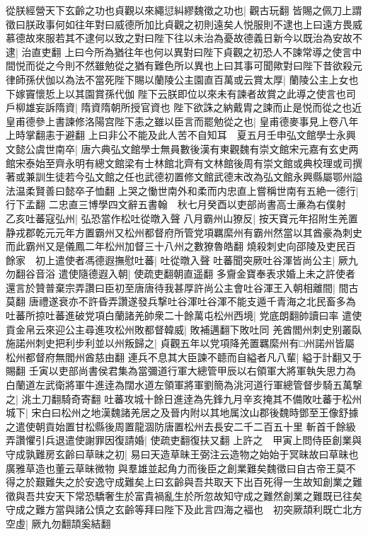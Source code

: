 從朕經營天下玄齡之功也貞觀以來繩愆糾繆魏徵之功也|{
	觀古玩翻}
皆賜之佩刀上謂徵曰朕政事何如往年對曰威德所加比貞觀之初則遠矣人悦服則不逮也上曰遠方畏威慕德故來服若其不逮何以致之對曰陛下往以未治為憂故德義日新今以既治為安故不逮|{
	治直吏翻}
上曰今所為猶往年也何以異對曰陛下貞觀之初恐人不諫常導之使言中間悦而從之今則不然雖勉從之猶有難色所以異也上曰其事可聞歟對曰陛下昔欲殺元律師孫伏伽以為法不當死陛下賜以蘭陵公主園直百萬或云賞太厚|{
	蘭陵公主上女也下嫁竇懷悊上以其園賞孫代伽}
陛下云朕即位以來未有諫者故賞之此導之使言也司戶柳雄妄訴隋資|{
	隋資隋朝所授官資也}
陛下欲誅之納戴胄之諫而止是悦而從之也近皇甫德參上書諫修洛陽宫陛下恚之雖以臣言而罷勉從之也|{
	皇甫德麥事見上卷八年上時掌翻恚于避翻}
上曰非公不能及此人苦不自知耳　夏五月壬申弘文館學士永興文懿公虞世南卒|{
	唐六典弘文館學士無員數後漢有東觀魏有崇文館宋元嘉有玄史两館宋泰始至齊永明有總文館梁有士林館北齊有文林館後周有崇文館或典校理或司撰著或兼訓生徒若今弘文館之任也武德初置修文館武德末改為弘文館永興縣屬鄂州謚法温柔賢善曰懿卒子恤翻}
上哭之慟世南外和柔而内忠直上嘗稱世南有五絶一德行|{
	行下孟翻}
二忠直三博學四文辭五書翰　秋七月癸酉以吏部尚書高士亷為右僕射　乙亥吐蕃寇弘州|{
	弘恐當作松吐從暾入聲}
八月霸州山獠反|{
	按天寶元年招附生羌置静戎郡乾元元年方置霸州又松州都督府所管党項羈縻州有霸州然當以其酋豪為刺史而此霸州又是儀鳳二年松州加督三十八州之數獠魯皓翻}
燒殺刺史向邵陵及吏民百餘家　初上遣使者馮德遐撫慰吐蕃|{
	吐從暾入聲}
吐蕃聞突厥吐谷渾皆尚公主|{
	厥九勿翻谷音浴}
遣使隨德遐入朝|{
	使疏吏翻朝直遥翻}
多齎金寶奉表求婚上未之許使者還言於贊普棄宗弄讚曰臣初至唐唐待我甚厚許尚公主會吐谷渾王入朝相離間|{
	間古莫翻}
唐禮遂衰亦不許昏弄讚遂發兵撃吐谷渾吐谷渾不能支遁千青海之北民畜多為吐蕃所掠吐蕃進破党項白蘭諸羌帥衆二十餘萬屯松州西境|{
	党底朗翻帥讀曰率}
遣使貢金帛云來迎公主尋進攻松州敗都督韓威|{
	敗補邁翻下敗吐同}
羌酋閻州刺史别叢臥施諾州刺史把利步利並以州叛歸之|{
	貞觀五年以党項降羌置羈縻州有□州諾州皆屬松州都督府無閻州酋慈由翻}
連兵不息其大臣諫不聼而自縊者凡八輩|{
	縊于計翻又于賜翻}
壬寅以吏部尚書侯君集為當彌道行軍大總管甲辰以右領軍大將軍執失思力為白蘭道左武衛將軍牛進逹為闊水道左領軍將軍劉簡為洮河道行軍總管督步騎五萬撃之|{
	洮土刀翻騎奇寄翻}
吐蕃攻城十餘日進逹為先鋒九月辛亥掩其不備敗吐蕃于松州城下|{
	宋白曰松州之地漢魏諸羌居之及晉内附以其地属汶山郡後魏時鄧至王像舒據之遣使朝貢始置甘松縣後周置龍涸防唐置松州去長安二千二百五十里}
斬首千餘級弄讚懼引兵退遣使謝罪因復請婚|{
	使疏吏翻復扶又翻}
上許之　甲寅上問侍臣創業與守成孰難房玄齡曰草昧之初|{
	易曰天造草昧王弼注云造物之始始于冥昧故曰草昧也廣雅草造也董云草昧微物}
與羣雄並起角力而後臣之創業難矣魏徵曰自古帝王莫不得之於艱難失之於安逸守成難矣上曰玄齡與吾共取天下出百死得一生故知創業之難徵與吾共安天下常恐驕奢生於富貴禍亂生於所忽故知守成之難然創業之難既已往矣守成之難方當與諸公慎之玄齡等拜曰陛下及此言四海之褔也　初突厥頡利既亡北方空虛|{
	厥九勿翻頡奚結翻}
